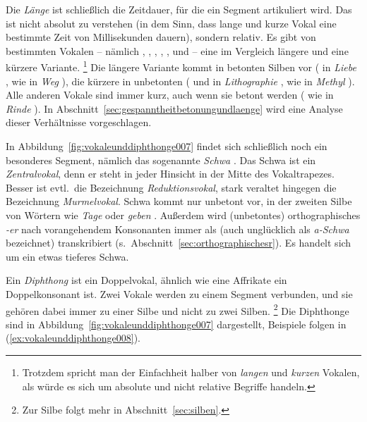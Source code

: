 Die \textit{Länge} ist schließlich die Zeitdauer, für die ein Segment artikuliert wird.
Das ist nicht absolut zu verstehen (in dem Sinn, dass lange und kurze Vokal eine bestimmte Zeit von Millisekunden dauern), sondern relativ.
Es gibt von bestimmten Vokalen -- nämlich \textipa{[i]}, \textipa{[y]}, \textipa{[u]}, \textipa{[e]}, \textipa{[\o]}, \textipa{[o]} und \textipa{[a]} -- eine im Vergleich längere und eine kürzere Variante.%
\footnote{Trotzdem spricht man der Einfachheit halber von \textit{langen} und \textit{kurzen} Vokalen, als würde es sich um absolute und nicht relative Begriffe handeln.}
Die längere Variante kommt in betonten Silben vor (\textipa{[i:]} in \textit{Liebe} \textipa{[li:b@]}, \textipa{[e:]} wie in \textit{Weg} \textipa{[ve:k]}), die kürzere in unbetonten (\textipa{[i]} und \textipa{[o]} in \textit{Lithographie} \textipa{[litogKafi:]}, \textipa{[e]} wie in \textit{Methyl} \mbox{\textipa{[mety:l]}}).
Alle anderen Vokale sind immer kurz, auch wenn sie betont werden (\textipa{[I]} wie in \textit{Rinde} \textipa{[KInd@]}).
In Abschnitt~\ref{sec:gespanntheitbetonungundlaenge} wird eine Analyse dieser Verhältnisse vorgeschlagen.

In Abbildung~\ref{fig:vokaleunddiphthonge007} findet sich schließlich noch ein besonderes Segment, nämlich das sogenannte \textit{Schwa} \textipa{[@]}.
Das Schwa ist ein \textit{Zentralvokal}, denn er steht in jeder Hinsicht in der Mitte des Vokaltrapezes.
Besser ist evtl.\ die Bezeichnung \textit{Reduktionsvokal}, stark veraltet hingegen die Bezeichnung \textit{Murmelvokal}.
Schwa kommt nur unbetont vor, \zB in der zweiten Silbe von Wörtern wie \textit{Tage} \textipa{[ta:g@]} oder \textit{geben} \textipa{[ge:b@n]}.
Außerdem wird (unbetontes) orthographisches \textit{-er} nach vorangehendem Konsonanten immer als \textipa{[5]} (auch unglücklich als \textit{a-Schwa} bezeichnet) transkribiert (s.\ Abschnitt~\ref{sec:orthographischesr}).
Es handelt sich um ein etwas tieferes Schwa.

Ein \textit{Diphthong} ist ein Doppelvokal, ähnlich wie eine Affrikate ein Doppelkonsonant ist.
Zwei Vokale werden zu einem Segment verbunden, und sie gehören dabei immer zu einer Silbe und nicht zu zwei Silben.%
\footnote{Zur Silbe folgt mehr in Abschnitt~\ref{sec:silben}.}
Die Diphthonge sind in Abbildung~\ref{fig:vokaleunddiphthonge007} dargestellt, Beispiele folgen in (\ref{ex:vokaleunddiphthonge008}).

\begin{exe}
  \ex\label{ex:vokaleunddiphthonge008}
  \begin{xlist}
  \end{xlist}
\end{exe}

